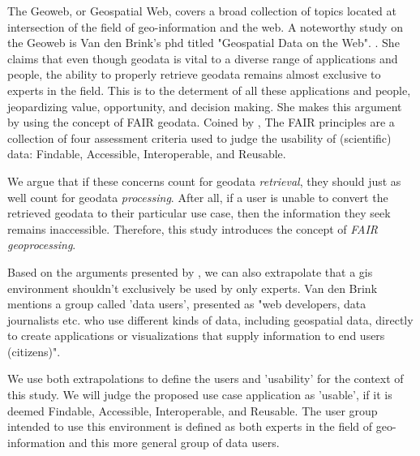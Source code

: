 The Geoweb, or Geospatial Web, covers a broad collection of topics located at intersection of the field of geo-information and the web. A noteworthy study on the Geoweb is Van den Brink's phd titled "Geospatial Data on the Web". \cite{brink_geospatial_2018}. She claims that even though geodata is vital to a diverse range of applications and people, the ability to properly retrieve geodata remains almost exclusive to experts in the field. This is to the determent of all these applications and people, jeopardizing value, opportunity, and decision making. She makes this argument by using the concept of FAIR geodata. Coined by \cite{mark_d_wilkinson_fair_2016}, The FAIR principles are a collection of four assessment criteria used to judge the usability of (scientific) data: Findable, Accessible, Interoperable, and Reusable. 

We argue that if these concerns count for geodata \textit{retrieval}, they should just as well count for geodata \textit{processing}. After all, if a user is unable to convert the retrieved geodata to their particular use case, then the information they seek remains inaccessible. Therefore, this study introduces the concept of \emph{FAIR geoprocessing}. 

Based on the arguments presented by \cite{brink_geospatial_2018}, we can also extrapolate that a \ac{gis} environment shouldn't exclusively be used by only experts. Van den Brink mentions a group called 'data users', presented as "web developers, data journalists etc. who use different kinds of data, including geospatial data, directly to create applications or visualizations that supply information to end users (citizens)". 

We use both extrapolations to define the users and 'usability' for the context of this study. We will judge the proposed use case application as 'usable', if it is deemed Findable, Accessible, Interoperable, and Reusable. The user group intended to use this environment is defined as both experts in the field of geo-information and this more general group of data users.
















